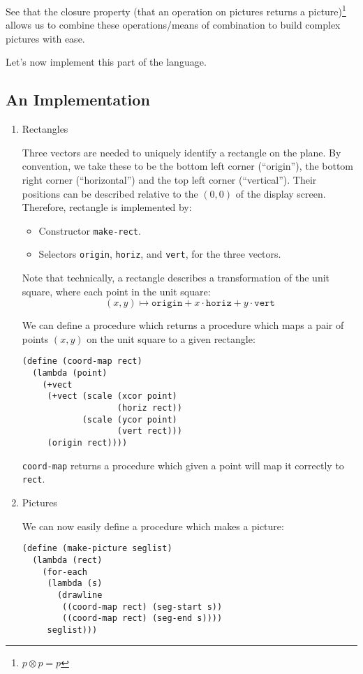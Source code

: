 \documentclass[9pt]{report}
\begin{document}
See that the closure property (that an operation on pictures
returns a picture)\footnote{\(p \otimes p = p\)} allows us to combine these operations/means of
combination to build complex pictures with ease.

Let's now implement this part of the language.

\subsection{An Implementation}
\label{sec:org2b350f1}

\begin{enumerate}
\item Rectangles
\label{sec:org1a329f4}

Three vectors are needed to uniquely identify a rectangle on the
plane. By convention, we take these to be the bottom left corner
(``origin''), the bottom right corner (``horizontal'') and the top
left corner (``vertical''). Their positions can be described
relative to the \((0,0)\) of the display screen. Therefore,
rectangle is implemented by:
\begin{itemize}
\item Constructor \texttt{make-rect}.
\item Selectors \texttt{origin}, \texttt{horiz}, and \texttt{vert}, for the three vectors.
\end{itemize}

Note that technically, a rectangle describes a transformation of
the unit square, where each point in the unit square:
$$(x,y)\mapsto \mathtt{origin} + x\cdot \mathtt{horiz} + y\cdot
     \mathtt{vert}$$

We can define a procedure which returns a procedure which maps
a pair of points \((x,y)\) on the unit square to a given rectangle:

\begin{verbatim}
(define (coord-map rect)
  (lambda (point)
    (+vect
     (+vect (scale (xcor point)
                   (horiz rect))
            (scale (ycor point)
                   (vert rect)))
     (origin rect))))
\end{verbatim}

\texttt{coord-map} returns a procedure which given a point will map it
correctly to \texttt{rect}.

\item Pictures
\label{sec:orgbd9189c}

We can now easily define a procedure which makes a picture:
\begin{verbatim}
(define (make-picture seglist)
  (lambda (rect)
    (for-each
     (lambda (s)
       (drawline
        ((coord-map rect) (seg-start s))
        ((coord-map rect) (seg-end s))))
     seglist)))
\end{verbatim}


\end{enumerate}
\end{document}
